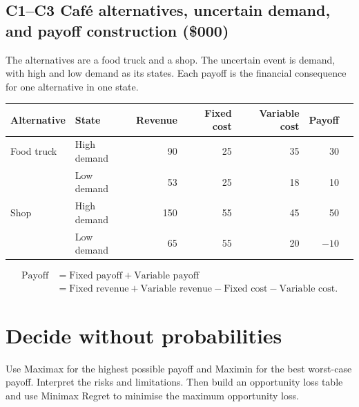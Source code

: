 \subsection*{C1--C3 \textemdash{} Café alternatives, uncertain demand, and payoff construction (\$000)}
The alternatives are a food truck and a shop. The uncertain event is demand, with high and low demand as its states. Each payoff is the financial consequence for one alternative in one state.

{\centering\small
\begin{tabular}{@{}llrrrrr@{}}
\toprule
Alternative & State & Revenue & Fixed cost & Variable cost & Payoff\\
\midrule
Food truck & High demand & 90 & 25 & 35 & 30\\
           & Low demand  & 53 & 25 & 18 & 10\\
\addlinespace
Shop       & High demand & 150 & 55 & 45 & 50\\
           & Low demand  & 65 & 55 & 20 & \(-10\)\\
\bottomrule
\end{tabular}\par}
\begin{align*}
\text{Payoff}
  &= \text{Fixed payoff} + \text{Variable payoff}\\
  &= \text{Fixed revenue} + \text{Variable revenue}
      - \text{Fixed cost} - \text{Variable cost}.
\end{align*}

\begin{criteria}
\end{criteria}

\clearpage
\section{Decide without probabilities}
Use Maximax for the highest possible payoff and Maximin for the best worst-case payoff. Interpret the risks and limitations. Then build an opportunity loss table and use Minimax Regret to minimise the maximum opportunity loss.

